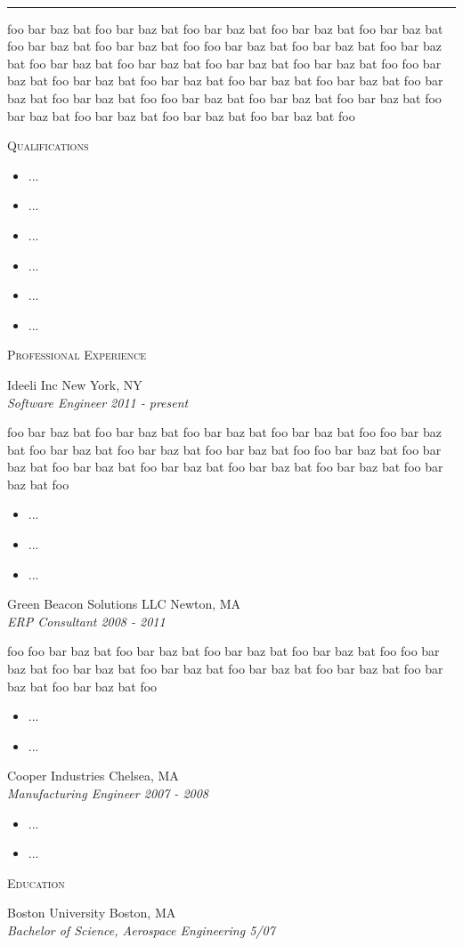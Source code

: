 \documentclass[10pt,oneside]{article}
\newcommand{\resheader}[4]{
    \begin{center}
        \selectfont \Huge \scshape #1 \\
        \vspace{2pt}
        \selectfont \small #2
    \end{center}

    \vspace{-7pt}
    \rule{\textwidth}{1pt}

    \vspace{-2pt}
    {\small \itshape #3 \hfill #4}
    \vspace{5pt}
}
\newcommand{\ressection}[1]{
    {\fontfamily{phv} \selectfont \large \scshape #1}
    \vspace{2pt}
}
\newcommand{\resitem}[4]{
    \vspace{2pt}
              #1 \hfill #2 \\
    {\itshape #3 \hfill #4}
    \vspace{2pt}
}
\begin{document}
     \selectfont
    \resheader{\name}{\email}{\addr}{\phone}

    foo bar baz bat foo  bar baz bat foo  bar baz bat foo  bar baz bat
    foo  bar baz bat foo  bar baz bat foo  bar baz bat foo foo bar baz
    bat foo  bar baz bat foo  bar baz bat foo  bar baz bat foo  bar baz
    bat foo  bar baz bat foo  bar baz bat foo foo bar baz bat foo  bar
    baz bat foo  bar baz bat foo  bar baz bat foo  bar baz bat foo  bar
    baz bat foo  bar baz bat foo foo bar baz bat foo  bar baz bat foo
    bar baz bat foo  bar baz bat foo  bar baz bat foo  bar baz bat foo
    bar baz bat foo 

    \vspace{10pt}

    \ressection{Qualifications}

    \begin{itemize}
    \item{...}
    \item{...}
    \item{...}
    \item{...}
    \item{...}
    \item{...}
    \end{itemize}

    \ressection{Professional Experience}

    \resitem{Ideeli Inc}{New York, NY}{Software Engineer}{2011 - present}

    foo bar baz bat foo bar baz bat foo bar baz bat foo bar baz bat foo
    foo bar baz bat foo bar baz bat foo bar baz bat foo bar baz bat foo
    foo bar baz bat foo bar baz bat foo bar baz bat foo bar baz bat foo
    bar baz bat foo bar baz bat foo bar baz bat foo

    \begin{itemize}
    \item{...}
    \item{...}
    \item{...}
    \end{itemize}

    \resitem{Green Beacon Solutions LLC}{Newton, MA}{ERP Consultant}{2008 - 2011}

    foo foo bar baz bat foo bar baz bat foo bar baz bat foo bar baz bat
    foo foo bar baz bat foo bar baz bat foo bar baz bat foo bar baz bat
    foo bar baz bat foo bar baz bat foo bar baz bat foo

    \begin{itemize}
    \item{...}
    \item{...}
    \end{itemize}

    \resitem{Cooper Industries}{Chelsea, MA}{Manufacturing Engineer}{2007 - 2008}

    \begin{itemize}
    \item{...}
    \item{...}
    \end{itemize}

    \ressection{Education}

    \resitem{Boston University}{Boston, MA}{Bachelor of Science, Aerospace Engineering}{5/07}
\end{document}

